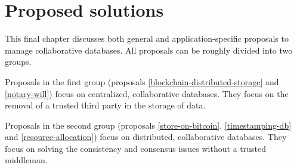 \chapter{Proposed solutions}

\iffalse
- general introduction of the several propsed methods, maybe putting them in two categories
\fi

This final chapter discusses both general and application-specific proposals to manage collaborative databases. All proposals can be roughly divided into two groups. 

Proposals in the first group (proposals \ref{blockchain-distributed-storage} and \ref{notary-will}) focus on centralized, collaborative databases. They focus on the removal of a trusted third party in the storage of data.

Proposals in the second group (proposals \ref{store-on-bitcoin}, \ref{timestamping-db} and \ref{resource-allocation}) focus on distributed, collaborative databases. They focus on solving the consistency and consensus issues without a trusted middleman. 


\newpage

\newpage

\newpage

\newpage

\newpage

\iffalse
other examples to discuss:

- resource allocation system based on namecoin
\fi